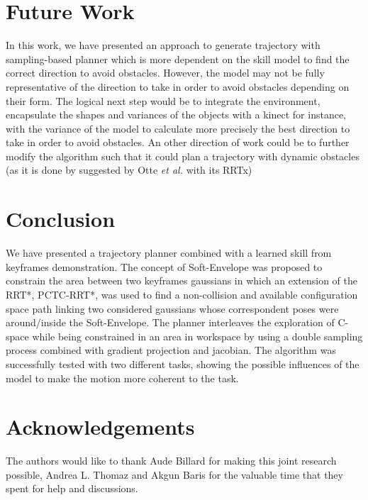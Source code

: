 \documentclass[letterpaper, 10 pt, conference]{ieeeconf}  %
\begin{document}
\section{Future Work}
In this work, we have presented an approach to generate trajectory with sampling-based planner which is more dependent on the skill model to find the correct direction to avoid obstacles. However, the model may not be fully representative of the direction to take in order to avoid obstacles depending on their form. The logical next step would be to integrate the environment, encapsulate the shapes and variances of the objects with a kinect for instance, with the variance of the model to calculate more precisely the best direction to take in order to avoid obstacles.
An other direction of work could be to further modify the algorithm such that it could plan a trajectory with dynamic obstacles (as it is done by suggested by Otte \textit{et al.} \cite{RRTx} with its RRTx) 

\section{Conclusion}
We have presented a trajectory planner combined with a learned skill from keyframes demonstration. The concept of Soft-Envelope was proposed to constrain the area between two keyframes gaussians in which an extension of the RRT*, PCTC-RRT*, was used to find a non-collision and available configuration space path linking two considered gaussians whose correspondent poses were around/inside the Soft-Envelope. The planner interleaves the exploration of C-space while being constrained in an area in workspace by using a double sampling process combined with gradient projection and jacobian.
The algorithm was successfully tested with two different tasks, showing the possible influences of the model to make the motion more coherent to the task. 

\section{Acknowledgements}
The authors would like to thank Aude Billard for making this joint research possible, Andrea L. Thomaz and Akgun Baris for the valuable time that they spent for help and discussions.


\end{document}
